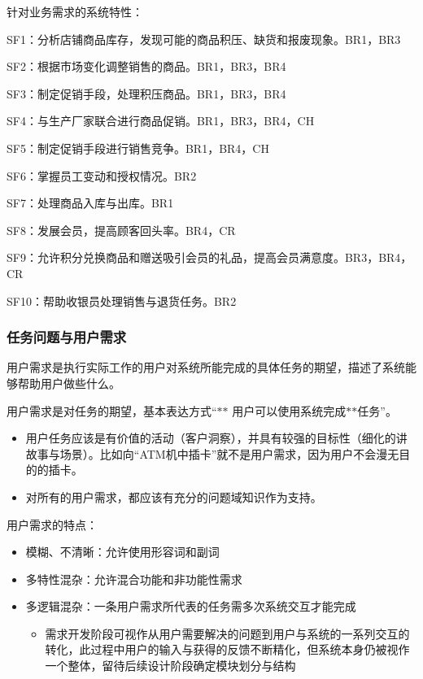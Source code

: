 针对业务需求的系统特性：
\vspace{-0.25em}
{\kaishu \begin{compactitem}
    \item SF1：分析店铺商品库存，发现可能的商品积压、缺货和报废现象。BR1，BR3
    \item SF2：根据市场变化调整销售的商品。BR1，BR3，BR4
    \item SF3：制定促销手段，处理积压商品。BR1，BR3，BR4
    \item SF4：与生产厂家联合进行商品促销。BR1，BR3，BR4，CH
    \item SF5：制定促销手段进行销售竞争。BR1，BR4，CH
    \item SF6：掌握员工变动和授权情况。BR2
    \item SF7：处理商品入库与出库。BR1
    \item SF8：发展会员，提高顾客回头率。BR4，CR
    \item SF9：允许积分兑换商品和赠送吸引会员的礼品，提高会员满意度。BR3，BR4，CR
    \item SF10：帮助收银员处理销售与退货任务。BR2
\end{compactitem}}


\subsubsection{任务问题与用户需求}
用户需求是执行实际工作的用户对系统所能完成的具体任务的期望，描述了系统能够帮助用户做些什么。

用户需求是对任务的期望，基本表达方式“$\ast$$\ast$ 用户可以使用系统完成$\ast$$\ast$任务”。
\begin{itemize}
    \item 用户任务应该是有价值的活动（客户洞察），并具有较强的目标性（细化的讲故事与场景）。比如向“ATM机中插卡”就不是用户需求，因为用户不会漫无目的的插卡。
    \item 对所有的用户需求，都应该有充分的问题域知识作为支持。
\end{itemize}

用户需求的特点：
\begin{itemize}
    \item 模糊、不清晰：允许使用形容词和副词 
    \item 多特性混杂：允许混合功能和非功能性需求 
    \item 多逻辑混杂：一条用户需求所代表的任务需多次系统交互才能完成
    \begin{itemize}
        \item 需求开发阶段可视作从用户需要解决的问题到用户与系统的一系列交互的转化，此过程中用户的输入与获得的反馈不断精化，但系统本身仍被视作一个整体，留待后续设计阶段确定模块划分与结构
    \end{itemize}
\end{itemize}

